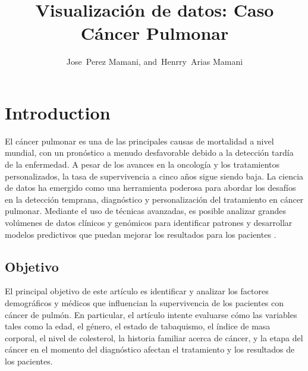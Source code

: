 \documentclass[10pt,journal,compsoc]{IEEEtran}
\begin{document}
\title{Visualización de datos: Caso Cáncer Pulmonar}


\author{Jose~Perez Mamani,
        and~Henrry~Arias Mamani%
}



\maketitle
\IEEEdisplaynontitleabstractindextext
\IEEEpeerreviewmaketitle


\ifCLASSOPTIONcompsoc
{}
\else
\section{Introduction}
\label{sec:introduction}
\fi

 El cáncer pulmonar es una de las principales causas de mortalidad a nivel mundial, con un pronóstico a menudo desfavorable debido a la detección tardía de la enfermedad. A pesar de los avances en la oncología y los tratamientos personalizados, la tasa de supervivencia a cinco años sigue siendo baja. La ciencia de datos ha emergido como una herramienta poderosa para abordar los desafíos en la detección temprana, diagnóstico y personalización del tratamiento en cáncer pulmonar. Mediante el uso de técnicas avanzadas, es posible analizar grandes volúmenes de datos clínicos y genómicos para identificar patrones y desarrollar modelos predictivos que puedan mejorar los resultados para los pacientes .

\subsection{Objetivo}
El principal objetivo de este artículo es identificar y analizar los factores demográficos y médicos que influencian la supervivencia de los pacientes con cáncer de pulmón. En particular, el artículo intente evaluarse cómo las variables tales como la edad, el género, el estado de tabaquismo, el índice de masa corporal, el nivel de colesterol, la historia familiar acerca de cáncer, y la etapa del cáncer en el momento del diagnóstico afectan el tratamiento y los resultados de los pacientes.
\end{document}
